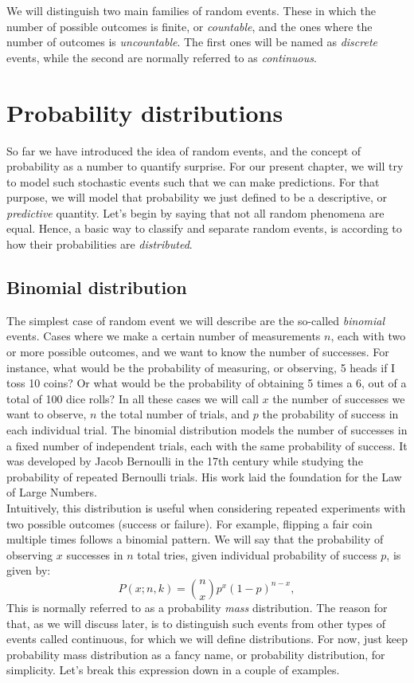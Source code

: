 \documentclass{book}
\begin{document}
We will distinguish two main families of random events. These in which the number of possible outcomes is finite, or \textit{countable}, and the ones where the number of outcomes is \textit{uncountable}. The first ones will be named as \textit{discrete} events, while the second are normally referred to as \textit{continuous}.

\newpage

\section{Probability distributions}
So far we have introduced the idea of random events, and the concept of probability as a number to quantify surprise. For our present chapter, we will try to model such stochastic events such that we can make predictions. For that purpose, we will model that probability we just defined to be a descriptive, or \textit{predictive} quantity. Let's begin by saying that not all random phenomena are equal. Hence, a basic way to classify and separate random events, is according to how their probabilities are \textit{distributed}.

\subsection{Binomial distribution}
The simplest case of random event we will describe are the so-called \textit{binomial} events. Cases where we make a certain number of measurements $n$, each with two or more possible outcomes, and we want to know the number of successes. For instance, what would be the probability of measuring, or observing, 5 heads if I toss 10 coins? Or what would be the probability of obtaining 5 times a 6, out of a total of 100 dice rolls? In all these cases we will call $x$ the number of successes we want to observe, $n$ the total number of trials, and $p$ the probability of success in each individual trial. The binomial distribution models the number of successes in a fixed number of independent trials, each with the same probability of success. It was developed by Jacob Bernoulli in the 17th century while studying the probability of repeated Bernoulli trials. His work laid the foundation for the Law of Large Numbers.\\

Intuitively, this distribution is useful when considering repeated experiments with two possible outcomes (success or failure). For example, flipping a fair coin multiple times follows a binomial pattern. We will say that the probability of observing $x$ successes in $n$ total tries, given individual probability of success $p$, is given by:
\begin{equation}
    P(x; n, k) = \binom{n}{x} p^x (1-p)^{n-x},
\end{equation}
This is normally referred to as a probability \textit{mass} distribution. The reason for that, as we will discuss later, is to distinguish such events from other types of events called continuous, for which we will define  distributions. For now, just keep probability mass distribution as a fancy name, or probability distribution, for simplicity. Let's break this expression down in a couple of examples.
\end{document}
